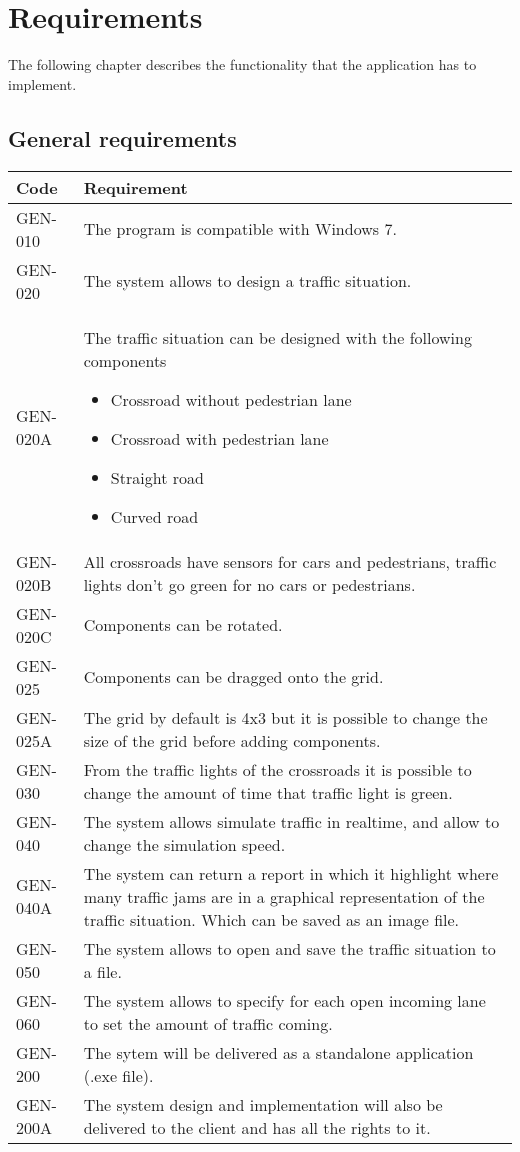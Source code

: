 \section{Requirements}
The following chapter describes the functionality that the application has to implement.
\subsection{General requirements}
\begin{tabularx}{\textwidth}{|p{2cm}X|}\hline
	Code & Requirement \\\hline
	GEN-010 & The program is compatible with Windows 7.\\\hline
	GEN-020 & The system allows to design a traffic situation.\\\hline
	GEN-020A & The traffic situation can be designed with the following components
	\begin{itemize}[noitemsep,nolistsep]
		\item Crossroad without pedestrian lane
		\item Crossroad with pedestrian lane
		\item Straight road
		\item Curved road
	\end{itemize}\\\hline
	GEN-020B & All crossroads have sensors for cars and pedestrians, traffic lights don't go green for no cars or pedestrians.\\\hline
	GEN-020C & Components can be rotated.\\\hline
	GEN-025 & Components can be dragged onto the grid.\\\hline
	GEN-025A & The grid by default is 4x3 but it is possible to change the size of the grid before adding components.\\\hline
	GEN-030 & From the traffic lights of the crossroads it is possible to change the amount of time that traffic light is green.\\\hline
	GEN-040 & The system allows simulate traffic in realtime, and allow to change the simulation speed.\\\hline
	GEN-040A & The system can return a report in which it highlight where many traffic jams are in a graphical representation of the traffic situation. Which can be saved as an image file.\\\hline
	GEN-050 & The system allows to open and save the traffic situation to a file.\\\hline
	GEN-060 & The system allows to specify for each open incoming lane to set the amount of traffic coming.\\\hline
	GEN-200 & The sytem will be delivered as a standalone application (.exe file).\\\hline
	GEN-200A & The system design and implementation will also be delivered to the client and has all the rights to it.\\\hline
\end{tabularx}

